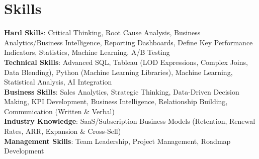 \section{Skills}
  \begin{itemize}[leftmargin=0.1in, label={}]
    \normalsize{\item{
      \textbf{Hard Skills}: Critical Thinking, Root Cause Analysis, Business Analytics/Business Intelligence, Reporting Dashboards, Define Key Performance Indicators, Statistics, Machine Learning, A/B Testing \\
      \textbf{Technical Skills}: Advanced SQL, Tableau (LOD Expressions, Complex Joins, Data Blending), Python (Machine Learning Libraries), Machine Learning, Statistical Analysis, AI Integration \\
      \textbf{Business Skills}: Sales Analytics, Strategic Thinking, Data-Driven Decision Making, KPI Development, Business Intelligence, Relationship Building, Communication (Written \& Verbal) \\
      \textbf{Industry Knowledge}: SaaS/Subscription Business Models (Retention, Renewal Rates, ARR, Expansion \& Cross-Sell) \\
      \textbf{Management Skills}: Team Leadership, Project Management, Roadmap Development \\
     }}
  \end{itemize}
